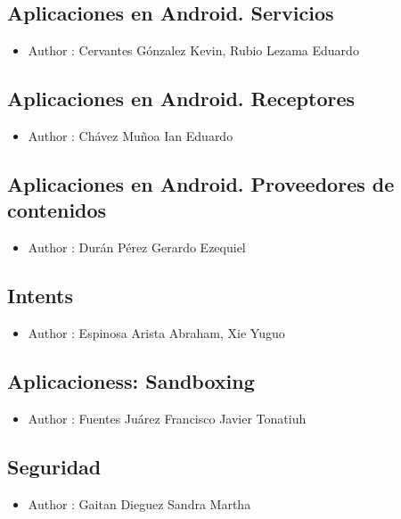 \documentclass[a4paper]{article}
\begin{document}
\subsection{Aplicaciones en Android. Servicios}
\begin{itemize}
\item Author : Cervantes Gónzalez Kevin, Rubio Lezama Eduardo
\end{itemize}

\subsection{Aplicaciones en Android. Receptores}
\begin{itemize}
\item Author : Chávez Muñoa Ian Eduardo
\end{itemize}

\subsection{Aplicaciones en Android. Proveedores de
contenidos}
\begin{itemize}
\item Author : Durán Pérez Gerardo Ezequiel
\end{itemize}

\subsection{Intents}
\begin{itemize}
\item Author : Espinosa Arista Abraham, Xie Yuguo
\end{itemize}

\subsection{Aplicacioness: Sandboxing}
\begin{itemize}
\item Author : Fuentes Juárez Francisco Javier Tonatiuh

\end{itemize}

\subsection{Seguridad}
\begin{itemize}
\item Author : Gaitan Dieguez Sandra Martha
\end{itemize}
\end{document}
